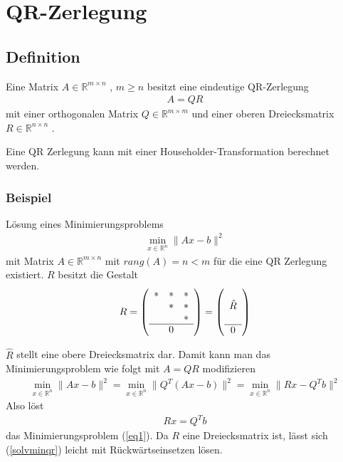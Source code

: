 \chapter{QR-Zerlegung}

\section{Definition}
Eine Matrix $A \in \mathbb{R}^{m \times n}$ , $m \ge n$ besitzt eine eindeutige QR-Zerlegung
\begin{align}
A = QR
\end{align}
mit einer orthogonalen Matrix $ Q \in \mathbb{R}^{m \times m} $ und einer oberen Dreiecksmatrix $ R \in \mathbb{R}^{n \times n}$ \cite{num1}.

Eine QR Zerlegung kann mit einer Householder-Transformation berechnet werden.

\subsection{Beispiel}
Lösung eines Minimierungsproblems
\begin{align}
\min_{x \in \mathbb{R}^n} \|Ax-b\|^2 \label{eq1}
\end{align}
mit Matrix $A \in \mathbb{R}^{m\times n}$ mit $rang(A) = n < m$ für die eine QR Zerlegung existiert.
$R$ besitzt die Gestalt 
\begin{align*}
R=	
\left(\begin{array}{ccc}
*&*&* \\ 
&*&* \\ 
& &* \\ \hline
& 0 &
\end{array} \right)
=
\left(\begin{array}{c}
\\ 
\hat{R} \\ 
\\ \hline
0
\end{array} \right) 
\end{align*}

$\hat{R}$ stellt eine obere Dreiecksmatrix dar.
Damit kann man das Minimierungsproblem wie folgt mit $A=QR$ modifizieren
\begin{align}
\min_{x \in \mathbb{R}^n} \|Ax-b\|^2 =
\min_{x \in \mathbb{R}^n} \|Q^T(Ax-b)\|^2 =
\min_{x \in \mathbb{R}^n} \|Rx-Q^Tb\|^2
\end{align}
Also löst
\begin{align}
Rx=Q^Tb \label{solvminqr}
\end{align}
das Minimierungsproblem (\ref{eq1}). Da $R$ eine Dreiecksmatrix ist, lässt sich (\ref{solvminqr}) leicht mit Rückwärtseinsetzen  lösen.

